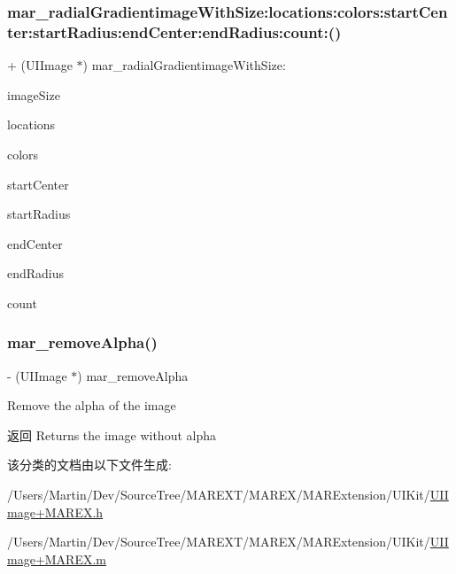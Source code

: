 \subsubsection{\texorpdfstring{mar\+\_\+radial\+Gradientimage\+With\+Size\+:locations\+:colors\+:start\+Center\+:start\+Radius\+:end\+Center\+:end\+Radius\+:count\+:()}{mar\_radialGradientimageWithSize:locations:colors:startCenter:startRadius:endCenter:endRadius:count:()}}
{\footnotesize\ttfamily + (U\+I\+Image $\ast$) mar\+\_\+radial\+Gradientimage\+With\+Size\+: \begin{DoxyParamCaption}\item[{(C\+G\+Size)}]{image\+Size }\item[{locations:(N\+S\+Array $\ast$)}]{locations }\item[{colors:(N\+S\+Array $\ast$)}]{colors }\item[{startCenter:(C\+G\+Point)}]{start\+Center }\item[{startRadius:(C\+G\+Float)}]{start\+Radius }\item[{endCenter:(C\+G\+Point)}]{end\+Center }\item[{endRadius:(C\+G\+Float)}]{end\+Radius }\item[{count:(size\+\_\+t)}]{count }\end{DoxyParamCaption}\hspace{0.3cm}{\ttfamily [implementation]}}

\mbox{\label{category_u_i_image_07_m_a_r_e_x_08_a85b26769b4054507083a31c2b40eafc0}} 
\subsubsection{\texorpdfstring{mar\+\_\+remove\+Alpha()}{mar\_removeAlpha()}}
{\footnotesize\ttfamily -\/ (U\+I\+Image $\ast$) mar\+\_\+remove\+Alpha \begin{DoxyParamCaption}{ }\end{DoxyParamCaption}}

Remove the alpha of the image

\begin{DoxyReturn}{返回}
Returns the image without alpha 
\end{DoxyReturn}


该分类的文档由以下文件生成\+:\begin{DoxyCompactItemize}
\item 
/\+Users/\+Martin/\+Dev/\+Source\+Tree/\+M\+A\+R\+E\+X\+T/\+M\+A\+R\+E\+X/\+M\+A\+R\+Extension/\+U\+I\+Kit/\hyperlink{_u_i_image_09_m_a_r_e_x_8h}{U\+I\+Image+\+M\+A\+R\+E\+X.\+h}\item 
/\+Users/\+Martin/\+Dev/\+Source\+Tree/\+M\+A\+R\+E\+X\+T/\+M\+A\+R\+E\+X/\+M\+A\+R\+Extension/\+U\+I\+Kit/\hyperlink{_u_i_image_09_m_a_r_e_x_8m}{U\+I\+Image+\+M\+A\+R\+E\+X.\+m}\end{DoxyCompactItemize}
